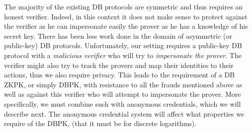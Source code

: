 The majority of the existing \ac{DB} protocols are symmetric and thus requires an honest verifier.
Indeed, in this context it does not make sense to protect against the verifier as he can impersonate easily the prover as he has a knowledge of his secret key.
There has been less work done in the domain of asymmetric (or public-key) \ac{DB} protocols.
Unfortunately, our setting requires a public-key \ac{DB} protocol with a \emph{malicious verifier} who will try to \emph{impersonate the prover}.
The verifier might also try to track the provers and map their identities to their actions, thus we also require privacy.
This leads to the requirement of a \ac{DB} \ac{ZKPK}, or simply \ac{DBPK}, with resistance to all the frauds mentioned above as well as against this verifier 
who will attempt to impersonate the prover.
More specifically, we must combine such  with anonymous credentials, which we will describe next.
The anonymous credential system will affect what properties we require of the \ac{DBPK}, (\eg that it must be  for discrete logarithms).

